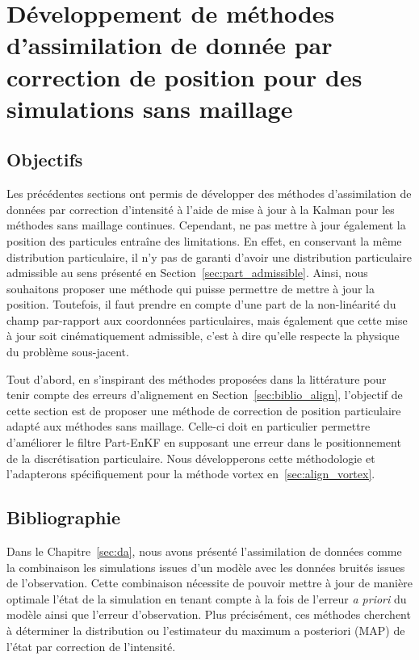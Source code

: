 
\chapter{Développement de méthodes d'assimilation de donnée par correction de position pour des simulations sans maillage}

\section{Objectifs}

Les précédentes sections ont permis de développer des méthodes d'assimilation de données par correction d'intensité à l'aide de mise à jour à la Kalman pour les méthodes sans maillage continues. Cependant, ne pas mettre à jour également la position des particules entraîne des limitations. En effet, en conservant la même distribution particulaire, il n'y pas de garanti d'avoir une distribution particulaire admissible au sens présenté en Section~\ref{sec:part_admissible}.
Ainsi, nous souhaitons proposer une méthode qui puisse permettre de mettre à jour la position. Toutefois, il faut prendre en compte d'une part de la non-linéarité du champ par-rapport aux coordonnées particulaires, mais également que cette mise à jour soit cinématiquement admissible, c'est à dire qu'elle respecte la physique du problème sous-jacent.

Tout d'abord, en s'inspirant des méthodes proposées dans la littérature pour tenir compte des erreurs d'alignement en Section~\ref{sec:biblio_align}, l'objectif de cette section est de proposer une méthode de correction de position particulaire adapté aux méthodes sans maillage. Celle-ci doit en particulier permettre d'améliorer le filtre Part-EnKF en supposant une erreur dans le positionnement de la discrétisation particulaire. Nous développerons cette méthodologie et l'adapterons spécifiquement pour la méthode vortex en~\ref{sec:align_vortex}.

\section{Bibliographie}

Dans le Chapitre~\ref{sec:da}, nous avons présenté l'assimilation de données comme la combinaison les simulations issues d'un modèle avec les données bruités issues de l'observation. Cette combinaison nécessite de pouvoir mettre à jour de manière optimale l'état de la simulation en tenant compte à la fois de l'erreur \textit{a priori} du modèle ainsi que l'erreur d'observation. Plus précisément, ces méthodes cherchent à déterminer la distribution ou l'estimateur du maximum a posteriori (MAP) de l'état par correction de l'intensité.

